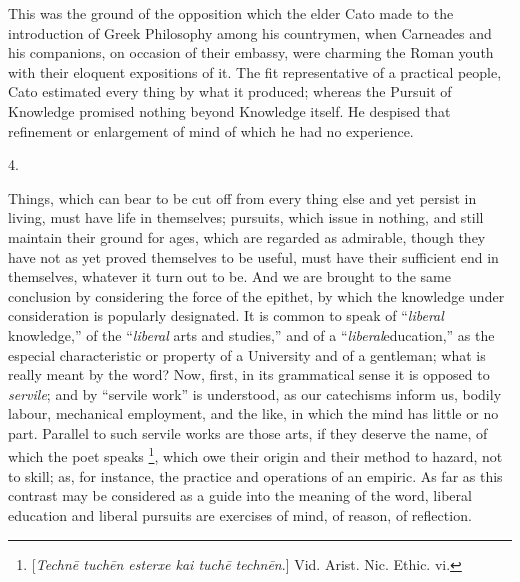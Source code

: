 This was the ground of the opposition which the elder Cato made to
the introduction of Greek Philosophy among his countrymen, when
Carneades and his companions, on occasion of their embassy, were
charming the Roman youth with their eloquent expositions of it. The
fit representative of a practical people, Cato estimated every thing
by what it produced; whereas the Pursuit of Knowledge promised nothing
beyond Knowledge itself. He despised that refinement or enlargement of
mind of which he had no experience.

4.

Things, which can bear to be cut off from every thing else and yet
persist in living, must have life in themselves; pursuits, which issue
in nothing, and still maintain their ground for ages, which are
regarded as admirable, though they have not as yet proved themselves
to be useful, must have their sufficient end in themselves, whatever
it turn out to be. And we are brought to the same conclusion by
considering the force of the epithet, by which the knowledge under
consideration is popularly designated. It is common to speak of ``\emph{liberal}
knowledge,'' of the ``\emph{liberal} arts and studies,''
and of a ``\emph{liberal}education,'' as the especial
characteristic or property of a University and of a gentleman; what is
really meant by the word? Now, first, in its grammatical sense it is
opposed to \emph{servile}; and by ``servile work'' is
understood, as our catechisms inform us, bodily labour, mechanical
employment, and the like, in which the mind has little or no part.
Parallel to such servile works are those arts, if they deserve the
name, of which the poet speaks \footnote{[\emph{Techn\={e}
tuch\={e}n esterxe kai tuch\={e} techn\={e}n}.] Vid. Arist. Nic. Ethic. vi.}, which owe their origin and their method to hazard, not to
skill; as, for instance, the practice and operations of an empiric. As
far as this contrast may be considered as a guide into the meaning of
the word, liberal education and liberal pursuits are exercises of
mind, of reason, of reflection.

